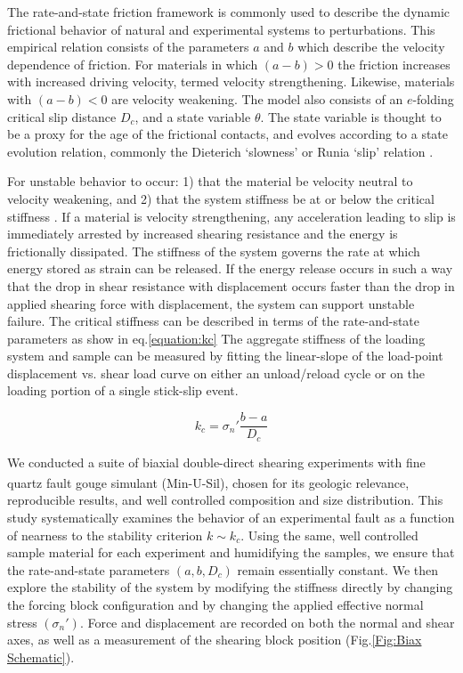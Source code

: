 \documentclass[11pt]{article}
\begin{document}
The rate-and-state friction framework is commonly used to describe the dynamic
frictional behavior of natural and experimental systems to perturbations. This
empirical relation consists of the parameters $a$ and $b$ which describe the
velocity dependence of friction. For materials in which $(a-b)>0$ the friction
increases with increased driving velocity, termed velocity strengthening. Likewise,
materials with $(a-b)<0$ are velocity weakening. The model also consists of an
$e$-folding critical slip distance $D_c$, and a state variable $\theta$. The
state variable is thought to be a proxy for the age of the frictional contacts, and
evolves according to a state evolution relation, commonly the Dieterich `slowness'
or Runia `slip' relation \cite{Marone:1998,Dieterich:1979,Ruina:1983}.

For unstable behavior to occur: 1) that the material be
velocity neutral to velocity weakening, and 2) that the system stiffness be at
or below the critical stiffness \cite{Marone:1998, Scholz:2002}. If a
material is velocity strengthening, any acceleration leading to slip is
immediately arrested by increased shearing resistance and the energy is
frictionally dissipated. The stiffness of the system governs the rate at which
energy stored as strain can be released. If the energy release occurs in such a
way that the drop in shear resistance with displacement occurs faster than the
drop in applied shearing force with displacement, the system can support
unstable failure. The critical stiffness can be described in terms of the
rate-and-state parameters as show in eq.\ref{equation:kc} The aggregate stiffness of
the loading system and sample can be measured by fitting the linear-slope
of the load-point displacement vs. shear load curve on either an unload/reload
cycle or on the loading portion of a single stick-slip event.

\begin{equation}
    k_c = \sigma_n' \frac{b-a}{D_c}
    \label{equation:kc}
\end{equation}

We conducted a suite of biaxial double-direct shearing experiments with fine
quartz fault gouge simulant (Min-U-Sil\textsuperscript{\textregistered}), chosen
for its geologic relevance, reproducible results, and well controlled
composition and size distribution. This study systematically examines the
behavior of an experimental fault as a function of nearness to the stability
criterion $k \sim k_c$. Using the same, well  controlled sample material for
each experiment and humidifying the samples, we ensure that the rate-and-state
parameters $(a,b,D_c)$ remain essentially constant. We then explore the stability
of the system by modifying the stiffness directly by changing the forcing block
configuration and by changing the applied effective normal stress $(\sigma_n')$.
Force and displacement are recorded on both the normal and shear axes, as well
as a measurement of the shearing block position (Fig.\ref{Fig:Biax Schematic}).
\end{document}
